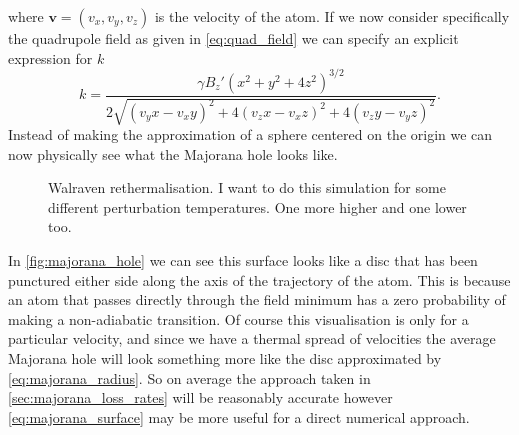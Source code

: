 where $\mathbf{v} = \left(v_x,v_y,v_z\right)$ is the velocity of the atom.
If we now consider specifically the quadrupole field as given in \autoref{eq:quad_field} we can specify an explicit expression for $k$
\begin{equation}
    k = \frac{\gamma  B_z' \left(x^2+y^2+4 z^2\right)^{3/2}}{2 \sqrt{(v_y x- v_x y)^2+4 (v_z x-v_x z)^2+4 (v_z y-v_y z)^2}}.
\end{equation}
Instead of making the approximation of a sphere centered on the origin we can now physically see what the Majorana hole looks like.
\begin{figure}
\hspace{-8em}
\caption{Walraven rethermalisation. I want to do this simulation for some different perturbation temperatures. One more higher and one lower too.}\label{fig:majorana_hole}
\end{figure}
In \autoref{fig:majorana_hole} we can see this surface looks like a disc that has been punctured either side along the axis of the trajectory of the atom.
This is because an atom that passes directly through the field minimum has a zero probability of making a non-adiabatic transition.
Of course this visualisation is only for a particular velocity, and since we have a thermal spread of velocities the average Majorana hole will look something more like the disc approximated by \autoref{eq:majorana_radius}.
So on average the approach taken in \autoref{sec:majorana_loss_rates} will be reasonably accurate however \autoref{eq:majorana_surface} may be more useful for a direct numerical approach.



